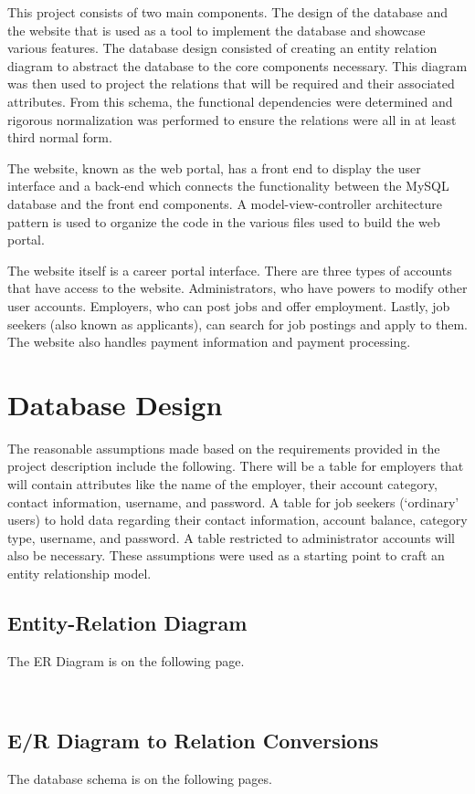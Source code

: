 \documentclass[11pt]{article}
\begin{document}
This project consists of two main components. The design of the database and the website that is used as a tool to implement the database and showcase various features. The database design consisted of creating an entity relation diagram to abstract the database to the core components necessary. This diagram was then used to project the relations that will be required and their associated attributes. From this schema, the functional dependencies were determined and rigorous normalization was performed to ensure the relations were all in at least third normal form. \par
The website, known as the web portal, has a front end to display the user interface and a back-end which connects the functionality between the MySQL database and the front end components. A model-view-controller architecture pattern is used to organize the code in the various files used to build the web portal. \par
The website itself is a career portal interface. There are three types of accounts that have access to the website. Administrators, who have powers to modify other user accounts. Employers, who can post jobs and offer employment. Lastly, job seekers (also known as applicants), can search for job postings and apply to them. The website also handles payment information and payment processing.

\section{Database Design}

The reasonable assumptions made based on the requirements provided in the project description include the following. There will be a table for employers that will contain attributes like the name of the employer, their account category, contact information, username, and password. A table for job seekers (`ordinary' users) to hold data regarding their contact information, account balance, category type, username, and password. A table restricted to administrator accounts will also be necessary. These assumptions were used as a starting point to craft an entity relationship model.

\subsection{Entity-Relation Diagram}
The ER Diagram is on the following page.

\newpage
$ $
\newpage 
\subsection{E/R Diagram to Relation Conversions}
The database schema is on the following pages.
\end{document}
